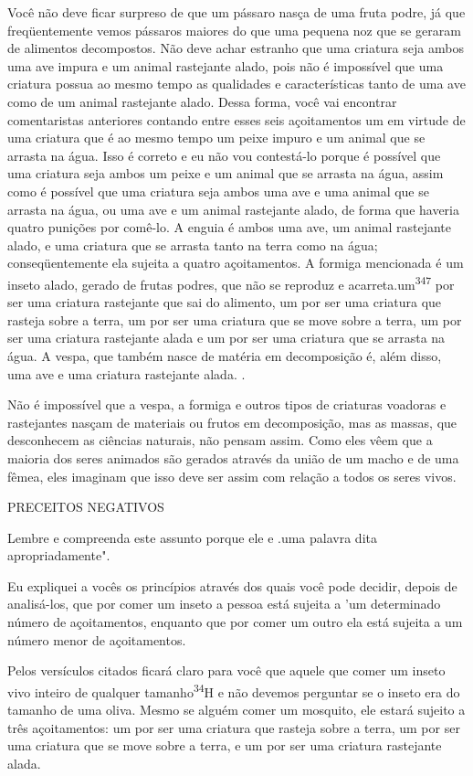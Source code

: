 \begin{itemize}
\begin{enumrate}
\begin{itemize}
\begin{itemize}
\begin{itemize}
Você não deve ficar surpreso de que um pássaro nasça de uma fruta podre,
já que freqüentemente vemos pássaros maiores do que uma pequena noz que
se geraram de alimentos decompostos. Não deve achar estranho que uma
criatura seja ambos uma ave impura e um animal rastejante alado, pois
não é impossível que uma criatura possua ao mesmo tempo as qualidades e
caracte­rísticas tanto de uma ave como de um animal rastejante alado.
Dessa forma, você vai encontrar comentaristas anteriores contando entre
esses seis açoita­mentos um em virtude de uma criatura que é ao mesmo
tempo um peixe impu­ro e um animal que se arrasta na água. Isso é
correto e eu não vou contestá-lo porque é possível que uma criatura seja
ambos um peixe e um animal que se arrasta na água, assim como é possível
que uma criatura seja ambos uma ave e uma animal que se arrasta na água,
ou uma ave e um animal rastejante alado, de forma que haveria quatro
punições por comê-lo. A enguia é ambos uma ave, um animal rastejante
alado, e uma criatura que se arrasta tanto na terra como na água;
conseqüentemente ela sujeita a quatro açoitamentos. A formiga
men­cionada é um inseto alado, gerado de frutas podres, que não se
reproduz e acar­reta.um\textsuperscript{347} por ser
uma criatura rastejante que sai do alimento, um por ser uma criatura que
rasteja sobre a terra, um por ser uma criatura que se move sobre a
terra, um por ser uma criatura rastejante alada e um por ser uma
criatura que se arrasta na água. A vespa, que também nasce de matéria em
decomposição é, além disso, uma ave e uma criatura rastejante alada. .

Não é impossível que a vespa, a formiga e outros tipos de criaturas
voadoras e rastejantes nasçam de materiais ou frutos em decomposição,
mas as massas, que desconhecem as ciências naturais, não pensam assim.
Como eles vêem que a maioria dos seres animados são gerados através da
união de um macho e de uma fêmea, eles imaginam que isso deve ser assim
com relação a todos os seres vivos.

PRECEITOS NEGATIVOS

Lembre e compreenda este assunto porque ele e .uma
palavra dita apropriadamente".

Eu expliquei a vocês os princípios através dos quais você pode deci­dir,
depois de analisá-los, que por comer um inseto a pessoa está sujeita a
'um determinado número de açoitamentos, enquanto que por comer um outro
ela está sujeita a um número menor de açoitamentos.

Pelos versículos citados ficará claro para você que aquele que co­mer um
inseto vivo inteiro de qualquer tamanho\textsuperscript{34}H e não
devemos perguntar se o inseto era do tamanho de uma oliva. Mesmo se
alguém comer um mosqui­to, ele estará sujeito a três açoitamentos: um
por ser uma criatura que rasteja sobre a terra, um por ser uma criatura
que se move sobre a terra, e um por ser uma criatura rastejante alada.


\end{itemize}
\end{itemize}
\end{itemize}
\end{enumrate}
\end{itemize}
